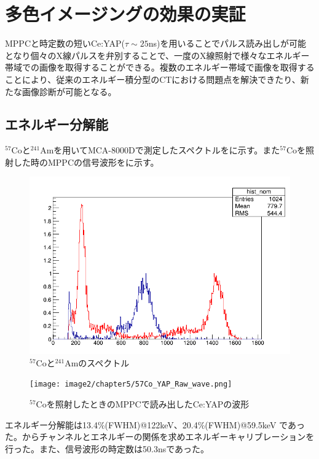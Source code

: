 \chapter{多色イメージングの効果の実証}      
MPPCと時定数の短いCe:YAP($\tau\sim25$ns)を用いることでパルス読み出しが可能となり個々のX線パルスを弁別することで、一度のX線照射で様々なエネルギー帯域での画像を取得することができる。複数のエネルギー帯域で画像を取得することにより、従来のエネルギー積分型のCTにおける問題点を解決できたり、新たな画像診断が可能となる。

\section{エネルギー分解能}
$^{57}$Coと$^{241}$Amを用いてMCA-8000Dで測定したスペクトルをに示す。また$^{57}$Coを照射した時のMPPCの信号波形をに示す。

\begin{figure}[H]
 \begin{center}
 \includegraphics[bb=0.000000 0.000000 696.000000 474.000000,width=0.6\hsize]{image2/chapter5/241Am_57Co_Gain5_000_100ns.png} 
 \end{center}
 \caption{$^{57}$Coと$^{241}$Amのスペクトル}
 \label{fig:57Co_241Am}
\end{figure}

\begin{figure}[H]
 \begin{center}
 \texttt{[image: image2/chapter5/57Co\_YAP\_Raw\_wave.png]} 
 \end{center}
 \caption{$^{57}$Coを照射したときのMPPCで読み出したCe:YAPの波形}
 \label{fig:YAP_waveform}
\end{figure}

エネルギー分解能は13.4\%(FWHM)@122keV、20.4\%(FWHM)@59.5keV であった。からチャンネルとエネルギーの関係を求めエネルギーキャリブレーションを行った。また、信号波形の時定数は50.3nsであった。


